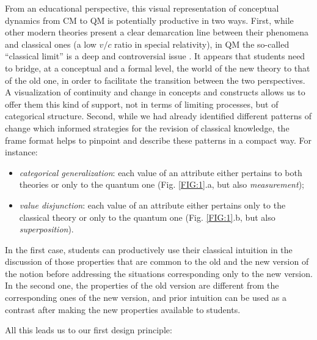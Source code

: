 \documentclass[twocolumn,secnumarabic,amssymb, nobibnotes, aps, prd, nofootinbib]{revtex4-2}
\begin{document}
From an educational perspective, this visual representation of conceptual dynamics from CM to QM is potentially productive in two ways. First, while other modern theories present a clear demarcation line between their phenomena and classical ones (a low $v/c$ ratio in special relativity), in QM the so-called ``classical limit'' is a deep and controversial issue \cite{Klein2012}. It appears that students need to bridge, at a conceptual and a formal level, the world of the new theory to that of the old one, in order to facilitate the transition between the two perspectives. A visualization of continuity and change in concepts and constructs allows us to offer them this kind of support, not in terms of limiting processes, but of categorical structure. Second, while we had already identified different patterns of change which informed strategies for the revision of classical knowledge, the frame format helps to pinpoint and describe these patterns in a compact way. For instance:
\begin{itemize}
\item \textit{categorical generalization}: each value of an attribute either pertains to both theories or only to the quantum one (Fig. \ref{FIG:1}.a, but also \textit{measurement});
\item \textit{value disjunction}: each value of an attribute either pertains only to the classical theory or only to the quantum one (Fig. \ref{FIG:1}.b, but also \textit{superposition}).
\end{itemize}
In the first case, students can productively use their classical intuition in the discussion of those properties that are common to the old and the new version of the notion before addressing the situations corresponding only to the new version. In the second one, the properties of the old version are different from the corresponding ones of the new version, and prior intuition can be used as a contrast after making the new properties available to students.

All this leads us to our first design principle:\\

\centerline{}
\end{document}
